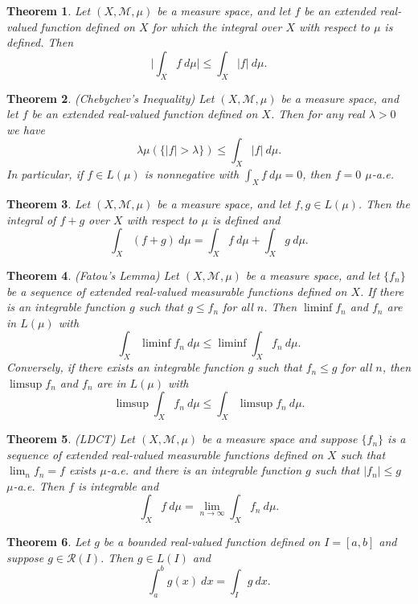 \documentclass[11pt]{amsart}
\newtheorem*{theorem*}{Theorem}
\theoremstyle{definition}
\renewcommand\leq{\leqslant}
\renewcommand\:{\colon}
\newcommand{\calM}{\mathcal{M}}
\newcommand{\calR}{\mathcal{R}}
\newcommand{\dmu}{\ d\mu}
\newcommand{\dx}{\ dx}
\begin{document}
\begin{theorem*}
	Let $(X, \calM, \mu)$ be a measure space, and let $f$ be an extended real-valued function defined on $X$ for which the integral over $X$ with respect to $\mu$ is defined. Then
		\[ \bigg\vert \int_X f \dmu \bigg\vert \leq \int_X \vert f \vert \dmu. \]
\end{theorem*}

\begin{theorem*}
	\textnormal{(Chebychev's Inequality)} Let $(X, \calM, \mu)$ be a measure space, and let $f$ be an extended real-valued function defined on $X$. Then for any real $\lambda > 0$ we have
		\[ \lambda \mu(\{|f| > \lambda\}) \leq \int_X |f| \dmu. \]
	In particular, if $f \in L(\mu)$ is nonnegative with $\int_X f\dmu = 0$, then $f = 0$ $\mu$-a.e.
\end{theorem*}

\begin{theorem*}
	Let $(X, \calM, \mu)$ be a measure space, and let $f, g \in L(\mu)$. Then the integral of $f + g$ over $X$ with respect to $\mu$ is defined and
		\[ \int_X (f + g) \dmu = \int_X f \dmu + \int_X g \dmu. \]
\end{theorem*}

\begin{theorem*}
	\textnormal{(Fatou's Lemma)} Let $(X, \calM, \mu)$ be a measure space, and let $\{f_n\}$ be a sequence of extended real-valued measurable functions defined on $X$. If there is an integrable function $g$ such that $g \leq f_n$ for all $n$. Then $\liminf f_n$ and $f_n$ are in $L(\mu)$ with
		\[ \int_X \liminf f_n \dmu \leq \liminf \int_X f_n \dmu. \]
	Conversely, if there exists an integrable function $g$ such that $f_n \leq g$ for all $n$, then $\limsup f_n$ and $f_n$ are in $L(\mu)$ with
		\[ \limsup \int_X f_n \dmu \leq \int_X \limsup f_n \dmu. \] 
\end{theorem*}

\begin{theorem*}
	\textnormal{(LDCT)} Let $(X, \calM, \mu)$ be a measure space and suppose $\{f_n\}$ is a sequence of extended real-valued measurable functions defined on $X$ such that $\lim_n f_n = f$ exists $\mu$-a.e. and there is an integrable function $g$ such that $|f_n| \leq g$ $\mu$-a.e. Then $f$ is integrable and 
		\[ \int_X f \dmu = \lim_{n\to\infty} \int_X f_n \dmu. \]
\end{theorem*}

\begin{theorem*}
	Let $g$ be a bounded real-valued function defined on $I = [a,b]$ and suppose $g \in \calR(I)$. Then $g \in L(I)$ and \[ \int_a^b g(x) \dx = \int_I g \dx. \]
\end{theorem*}
\end{document}
